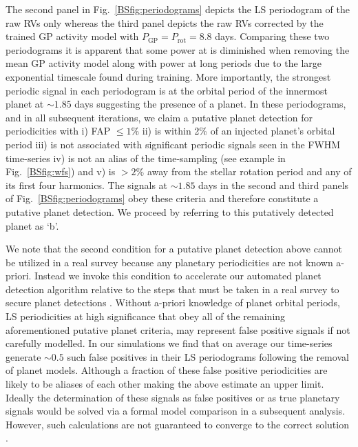 The second panel in Fig.~\ref{BSfig:periodograms} depicts the LS periodogram of the raw RVs only whereas
the third panel depicts the raw RVs corrected by the trained GP activity model with
$P_{\text{GP}}=P_{\text{rot}}=8.8$ days. Comparing these two periodograms it is apparent
that some power at \prot{} is diminished when removing the mean GP activity model
along with power at long periods due to the large exponential
timescale found during training. More importantly, the strongest periodic signal in each periodogram is
at the orbital period of the innermost planet at $\sim 1.85$ days suggesting the presence of a
planet. In these periodograms, and in all subsequent iterations, we claim a putative planet detection
for periodicities with i) FAP $\leq 1$\% ii) is within 2\% of an injected planet's orbital period iii)
is not associated with significant
periodic signals seen in the FWHM time-series iv) is not an alias of the time-sampling (see example in
Fig.~\ref{BSfig:wfs})
and v) is $>2$\% away from the stellar rotation period and any of its first four harmonics. The signals
at $\sim 1.85$ days in the second and third panels of Fig.~\ref{BSfig:periodograms} obey these criteria and
therefore constitute a putative planet detection. We proceed by referring to this putatively
detected planet as `b'.

We note that the second condition for a putative planet detection above cannot be utilized in a real survey
because any planetary periodicities are not known a-priori. Instead we invoke this condition to
accelerate our automated planet detection algorithm relative to the steps that must be taken in a real survey
to secure planet detections \citep[e.g. Bayesian model comparison;][]{ford07}.
Without a-priori knowledge of planet orbital periods, LS periodicities at high
significance that obey all of the remaining aforementioned putative planet criteria, may represent false positive
signals if not carefully modelled.
In our simulations we find that on average our time-series generate $\sim 0.5$ such false positives in their LS
periodograms following the removal of planet models. Although
a fraction of these false positive periodicities are likely to be aliases of each other making the above
estimate an upper limit. Ideally the determination of these signals as false positives or as true planetary
signals would be solved via a formal model comparison in a subsequent analysis. However, such calculations are
not guaranteed to converge to the correct solution \citep[see][]{dumusque17}.


